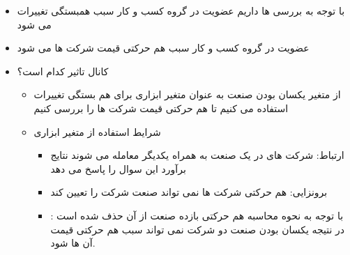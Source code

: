\documentclass[12pt, a4paper]{article}
\begin{document}
\begin{itemize}
\begin{itemize}
	
\end{itemize}





\item
با توجه به بررسی ها  داریم عضویت در گروه کسب و کار سبب همبستگی تغییرات 
می شود
\item
عضویت در گروه کسب و کار سبب هم حرکتی قیمت شرکت ها می شود
\item
کانال تاثیر کدام است؟
\begin{itemize}
\item
از متغیر یکسان بودن صنعت به عنوان متغیر ابزاری برای هم بستگی تغییرات
استفاده می کنیم تا هم حرکتی قیمت شرکت ها را بررسی کنیم
\item
شرایط استفاده از متغیر ابزاری
\begin{itemize}
\item
ارتباط: شرکت های در یک صنعت به همراه یکدیگر معامله می شوند 
نتایج برآورد 
این سوال را پاسخ می دهد
\item
برونزایی:
هم حرکتی شرکت ها نمی تواند صنعت شرکت را تعیین کند
\item
{}:
با توجه به نحوه محاسبه هم حرکتی بازده صنعت از آن حذف شده است
در نتیجه یکسان بودن صنعت دو شرکت نمی تواند سبب هم حرکتی قیمت آن ها شود.


\end{itemize}
\end{itemize}
\end{itemize}
\end{document}
